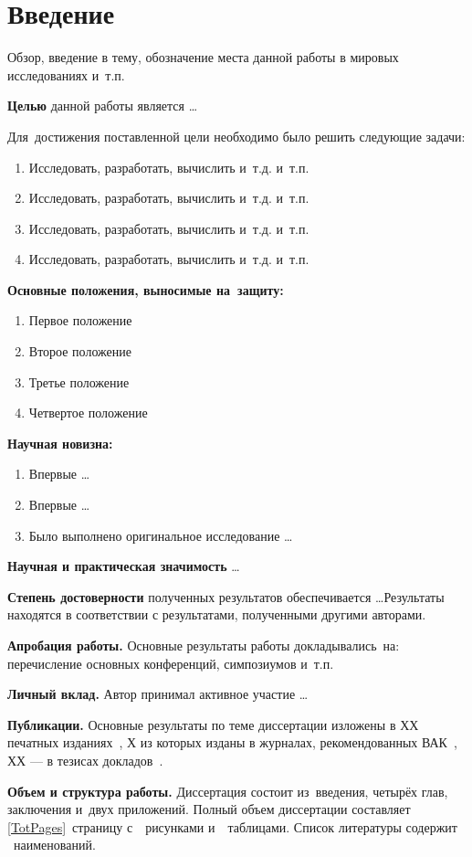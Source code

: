 \chapter*{Введение}							%
Обзор, введение в тему, обозначение места данной работы в мировых исследованиях и~т.\:п.

\textbf{Целью} данной работы является \ldots

Для~достижения поставленной цели необходимо было решить следующие задачи:
\begin{enumerate}
  \item Исследовать, разработать, вычислить и~т.\:д. и~т.\:п.
  \item Исследовать, разработать, вычислить и~т.\:д. и~т.\:п.
  \item Исследовать, разработать, вычислить и~т.\:д. и~т.\:п.
  \item Исследовать, разработать, вычислить и~т.\:д. и~т.\:п.
\end{enumerate}

\textbf{Основные положения, выносимые на~защиту:}
\begin{enumerate}
  \item Первое положение
  \item Второе положение
  \item Третье положение
  \item Четвертое положение
\end{enumerate}

\textbf{Научная новизна:}
\begin{enumerate}
  \item Впервые \ldots
  \item Впервые \ldots
  \item Было выполнено оригинальное исследование \ldots
\end{enumerate}

\textbf{Научная и практическая значимость} \ldots

\textbf{Степень достоверности} полученных результатов обеспечивается \ldots Результаты находятся в соответствии с результатами, полученными другими авторами.

\textbf{Апробация работы.}
Основные результаты работы докладывались~на:
перечисление основных конференций, симпозиумов и~т.\:п.

\textbf{Личный вклад.} Автор принимал активное участие \ldots

\textbf{Публикации.} Основные результаты по теме диссертации изложены в ХХ печатных изданиях~\cite{Sokolov,Gaidaenko,Lermontov,Management},
Х из которых изданы в журналах, рекомендованных ВАК~\cite{Sokolov,Gaidaenko}, 
ХХ --- в тезисах докладов~\cite{Lermontov,Management}.

\textbf{Объем и структура работы.} Диссертация состоит из~введения, четырёх глав, заключения и~двух приложений. Полный объем диссертации составляет  \ref*{TotPages}~страницу с~\totalfigures{}~рисунками и~\totaltables{}~таблицами. Список литературы содержит ~наименований.

\clearpage